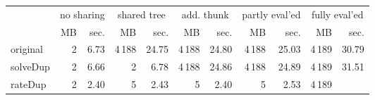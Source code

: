\makeatletter
\begin{tabular}{lrrrrrrrrrr}
 \\
& \multicolumn{2}{c}{no sharing}& \multicolumn{2}{c}{shared tree}& \multicolumn{2}{c}{add. thunk}& \multicolumn{2}{c}{partly eval'ed}& \multicolumn{2}{c}{fully eval'ed} \\
& MB & sec.& MB & sec.& MB & sec.& MB & sec.& MB & sec. \\ \midrule 
original%
&
 {\def\@currentlabel{2}\label{stats:Original:Unshared:mem}2} &
 {\def\@currentlabel{6.73}\label{stats:Original:Unshared:time}6.73}&
 {\def\@currentlabel{4\,188}\label{stats:Original:Shared:mem}4\,188} &
 {\def\@currentlabel{24.75}\label{stats:Original:Shared:time}24.75}&
 {\def\@currentlabel{4\,188}\label{stats:Original:SharedThunk:mem}4\,188} &
 {\def\@currentlabel{24.80}\label{stats:Original:SharedThunk:time}24.80}&
 {\def\@currentlabel{4\,188}\label{stats:Original:SharedEvaled:mem}4\,188} &
 {\def\@currentlabel{25.03}\label{stats:Original:SharedEvaled:time}25.03}&
 {\def\@currentlabel{4\,189}\label{stats:Original:SharedFull:mem}4\,189} &
 {\def\@currentlabel{30.79}\label{stats:Original:SharedFull:time}30.79} \\
\textsf{solveDup}%
&
 {\def\@currentlabel{2}\label{stats:SolveDup:Unshared:mem}2} &
 {\def\@currentlabel{6.66}\label{stats:SolveDup:Unshared:time}6.66}&
 {\def\@currentlabel{2}\label{stats:SolveDup:Shared:mem}2} &
 {\def\@currentlabel{6.78}\label{stats:SolveDup:Shared:time}6.78}&
 {\def\@currentlabel{4\,188}\label{stats:SolveDup:SharedThunk:mem}4\,188} &
 {\def\@currentlabel{24.86}\label{stats:SolveDup:SharedThunk:time}24.86}&
 {\def\@currentlabel{4\,188}\label{stats:SolveDup:SharedEvaled:mem}4\,188} &
 {\def\@currentlabel{24.89}\label{stats:SolveDup:SharedEvaled:time}24.89}&
 {\def\@currentlabel{4\,189}\label{stats:SolveDup:SharedFull:mem}4\,189} &
 {\def\@currentlabel{31.51}\label{stats:SolveDup:SharedFull:time}31.51} \\
\textsf{rateDup}%
&
 {\def\@currentlabel{2}\label{stats:RateDup:Unshared:mem}2} &
 {\def\@currentlabel{2.40}\label{stats:RateDup:Unshared:time}2.40}&
 {\def\@currentlabel{5}\label{stats:RateDup:Shared:mem}5} &
 {\def\@currentlabel{2.43}\label{stats:RateDup:Shared:time}2.43}&
 {\def\@currentlabel{5}\label{stats:RateDup:SharedThunk:mem}5} &
 {\def\@currentlabel{2.40}\label{stats:RateDup:SharedThunk:time}2.40}&
 {\def\@currentlabel{5}\label{stats:RateDup:SharedEvaled:mem}5} &
 {\def\@currentlabel{2.53}\label{stats:RateDup:SharedEvaled:time}2.53}&
 {\def\@currentlabel{4\,189}\label{stats:RateDup:SharedFull:mem}4\,189} &

\end{tabular}
